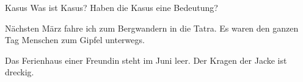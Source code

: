 \begin{frame}
  {Kasus}
  \pause
  Was ist Kasus? Haben die Kasus eine Bedeutung?
  \Halbzeile
  \pause
  \begin{exe}
    \ex
    \begin{xlist}
      \pause
      \pause
      \pause
    \end{xlist}
    \pause
    \ex
    \begin{xlist}
      \pause
      \pause
      \pause
    \end{xlist}
    \pause
    \ex
    \begin{xlist}
      \ex \alert<21->{Nächsten März} fahre ich zum Bergwandern in die Tatra.
      \ex Es waren \alert<22->{den ganzen Tag} Menschen zum Gipfel unterwegs.
    \end{xlist}
    \pause
    \ex
    \begin{xlist}
      \ex Das Ferienhaus \alert<23->{einer Freundin} steht im Juni leer.
      \ex Der Kragen \alert<24->{der Jacke}  ist dreckig.
    \end{xlist}
  \end{exe}
\end{frame}

